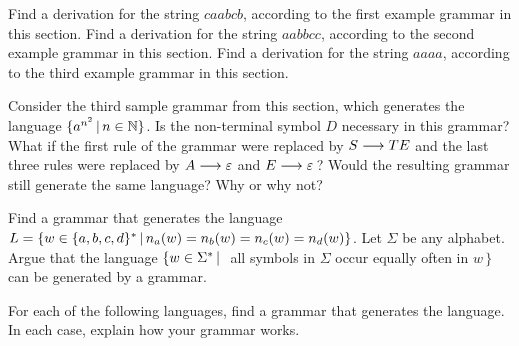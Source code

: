 \begin{exercises}

\problem Find a derivation for the string $caabcb$, according to the first example
grammar in this section.
Find a derivation for the string $aabbcc$, according to the second example
grammar in this section.
Find a derivation for the string $aaaa$, according to the third example
grammar in this section.

\problem Consider the third sample grammar from this section, which generates
the language $\{a^{n^2}\,|\, n\in{\mathbb N}\}$.  Is the non-terminal symbol $D$ necessary
in this grammar?  What if the first rule of the grammar were replaced by
$S\longrightarrow TE$ and the last three rules were replaced by $A\longrightarrow\varepsilon$
and $E\longrightarrow\varepsilon\,$?  Would the resulting grammar still generate
the same language?  Why or why not?

\problem Find a grammar that generates the language $L=\{w\in\{a,b,c,d\}^*\,|\,
n_a(w)=n_b(w)=n_c(w)=n_d(w)\}$.  Let $\Sigma$ be any alphabet.
Argue that the language $\{w\in\Sigma^*\,|\,\,$ all symbols in $\Sigma$ occur equally
often in $w\,\}$ can be generated by a grammar.

\problem For each of the following languages, find a grammar that generates
the language.  In each case, explain how your grammar works.


\end{exercises}




\endinput

